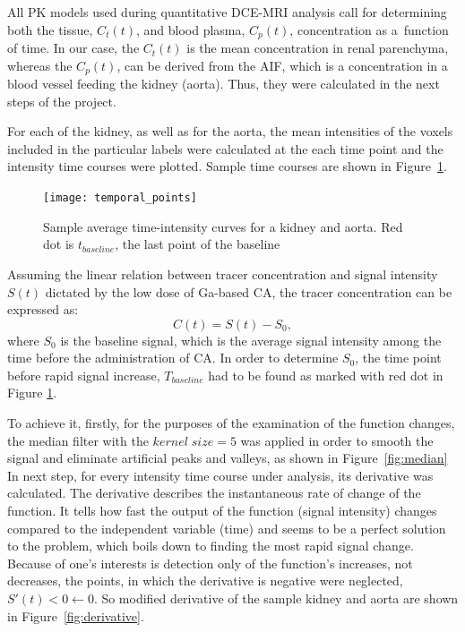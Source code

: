 All PK models used during quantitative DCE-MRI analysis call for determining both the tissue, $C_t(t)$, and blood plasma, $C_p(t)$, concentration as a~function of time. In our case, the $C_t(t)$ is the mean concentration in renal parenchyma, whereas the
$C_p(t)$, can be derived from the AIF, which is a concentration in a blood vessel feeding the kidney (aorta).
Thus, they were calculated in the next steps of the project.  

For each of the kidney, as well as for the aorta, the mean intensities of the voxels included in the particular labels were calculated at the each time point and the intensity time courses were plotted. Sample time courses are shown in Figure~\ref{fig:temporal_points}.

\vspace{50pt}
\begin{figure}[H]
	\centering
	\texttt{[image: temporal\_points]}
	
\caption[Sample average time-intensity curves for a kidney and aorta with marked last points of the baseline]{Sample average time-intensity curves for a kidney and aorta. Red dot is $t_{baseline}$, the last point of the baseline}
\label{fig:temporal_points}
\end{figure}



\newpage
Assuming the linear relation between tracer concentration and signal intensity $S(t)$ dictated by the low dose of Ga-based CA, the tracer concentration can be expressed as:
\begin{equation}
	\label{eq:conversion}
	C(t) = S(t)-S_0,
\end{equation}
where $S_0$ is the baseline signal, which is the average signal intensity among the time before the administration of CA. 
In order to determine $S_0$, the time point before rapid signal increase, $T_{baseline}$ had to be found  as marked with red dot in Figure \ref{fig:temporal_points}.

To achieve it, firstly, for the purposes of the examination of the function changes, the median filter  with the $kernel\;size = 5$ was applied in order to smooth the signal and eliminate artificial  peaks and valleys, as shown in Figure~\ref{fig:median}  
In next step, for every intensity time course under analysis, its derivative was calculated. The derivative describes the instantaneous rate of change of the function. It tells how fast the output of the function (signal intensity) changes compared to the independent variable (time) \cite{calculus} and seems to be a perfect solution to the problem, which boils down to finding the most rapid signal change. 
Because of one's interests is detection only of the function's increases, not decreases, the points, in which the derivative is negative were neglected, $S'(t)<0\leftarrow0$. So modified derivative of the sample kidney and aorta are shown in Figure~\ref{fig:derivative}.

